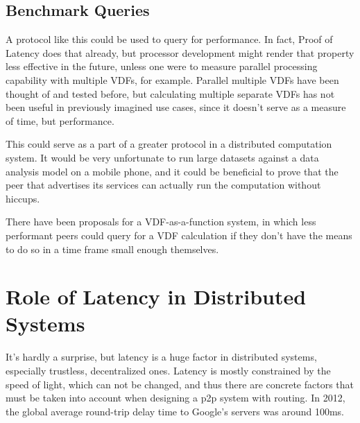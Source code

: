 \subsection{Benchmark Queries}
A protocol like this could be used to query for performance. In fact, Proof of Latency does that already, but processor development might render that property less effective in the future, unless one were to measure parallel processing capability with multiple VDFs, for example. Parallel multiple VDFs have been thought of and tested before, but calculating multiple separate VDFs has not been useful in previously imagined use cases, since it doesn't serve as a measure of time, but performance.

This could serve as a part of a greater protocol in a distributed computation system. It would be very unfortunate to run large datasets against a data analysis model on a mobile phone, and it could be beneficial to prove that the peer that advertises its services can actually run the computation without hiccups.

There have been proposals for a VDF-as-a-function system, in which less performant peers could query for a VDF calculation if they don't have the means to do so in a time frame small enough themselves. 

\section{Role of Latency in Distributed Systems}
It's hardly a surprise, but latency is a huge factor in distributed systems, especially trustless, decentralized ones. Latency is mostly constrained by the speed of light, which can not be changed, and thus there are concrete factors that must be taken into account when designing a p2p system with routing. In 2012, the global average round-trip delay time to Google's servers was around 100ms.\cite{Grigorik_undated-mc}

